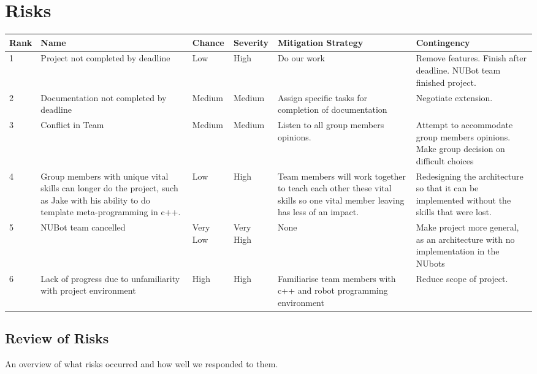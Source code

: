 \documentclass[a4paper]{article}
\begin{document}
\newpage
	\section{Risks}
		\begin{table}[htbp]
		\begin{tabularx}{\linewidth}{ | m{0.6cm} |  X | m{1.05cm} |  m{1.05cm} |  X | X |}
			\hline 
			Rank & Name & Chance & Severity & Mitigation Strategy & Contingency \\  \hline
			1 & Project not completed by deadline & Low & High & Do our work & Remove features. Finish after deadline. NUBot team finished project. \\ \hline
			2 & Documentation not completed by deadline & Medium & Medium & Assign specific tasks for completion of documentation & Negotiate extension. \\ \hline
			3 & Conflict in Team & Medium & Medium & Listen to all group members opinions. & Attempt to accommodate group members opinions. Make group decision on difficult choices \\ \hline
			4 & Group members with unique vital skills can longer do the project, such as Jake with his ability to do template meta-programming in c++. & Low & High & Team members will work together to teach each other these vital skills so one vital member leaving has less of an impact. & Redesigning the architecture so that it can be implemented without the skills that were lost. \\ \hline
			5 & NUBot team cancelled & Very Low & Very High & None & Make project more general, as an architecture with no implementation in the NUbots \\ \hline
			6 & Lack of progress due to unfamiliarity with project environment & High & High & Familiarise team members with c++ and robot programming environment & Reduce scope of project. \\ \hline
		\end{tabularx}
		\end{table}
		\subsection{Review of Risks}
			An overview of what risks occurred and how well we responded to them.
\end{document}

